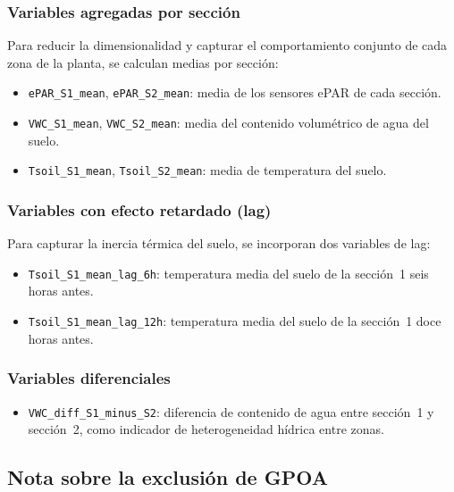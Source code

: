 \documentclass[12pt,a4paper]{article}
\begin{document}
\subsubsection{Variables agregadas por sección}

Para reducir la dimensionalidad y capturar el comportamiento conjunto de cada zona de
la planta, se calculan medias por sección:

\begin{itemize}[noitemsep]
    \item \texttt{ePAR\_S1\_mean}, \texttt{ePAR\_S2\_mean}: media de los sensores ePAR
        de cada sección.
    \item \texttt{VWC\_S1\_mean}, \texttt{VWC\_S2\_mean}: media del contenido volumétrico
        de agua del suelo.
    \item \texttt{Tsoil\_S1\_mean}, \texttt{Tsoil\_S2\_mean}: media de temperatura del
        suelo.
\end{itemize}

\subsubsection{Variables con efecto retardado (lag)}

Para capturar la inercia térmica del suelo, se incorporan dos variables de lag:

\begin{itemize}[noitemsep]
    \item \texttt{Tsoil\_S1\_mean\_lag\_6h}: temperatura media del suelo de la sección~1
        seis horas antes.
    \item \texttt{Tsoil\_S1\_mean\_lag\_12h}: temperatura media del suelo de la sección~1
        doce horas antes.
\end{itemize}

\subsubsection{Variables diferenciales}

\begin{itemize}[noitemsep]
    \item \texttt{VWC\_diff\_S1\_minus\_S2}: diferencia de contenido de agua entre sección~1
        y sección~2, como indicador de heterogeneidad hídrica entre zonas.
\end{itemize}

\subsection{Nota sobre la exclusión de GPOA}
\end{document}
